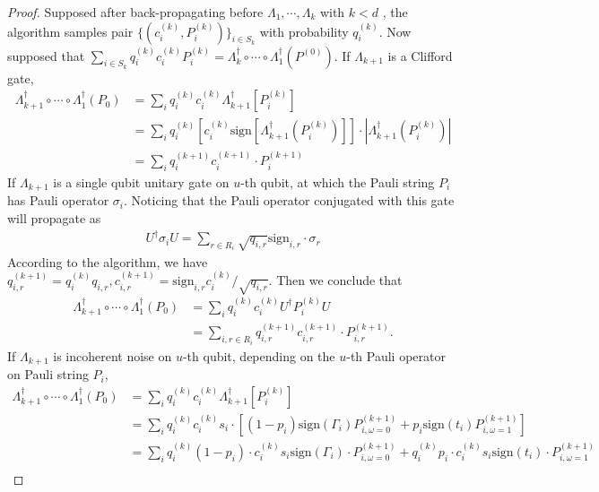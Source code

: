 \documentclass[aps,%
twocolumn,%
floatfix,%
pra,%
amsfonts,%
longbibliography,%
groupedaddress,%
superscriptaddress]{revtex4-2}%
\newcommand{\1}{\mathbbm{1}}
\begin{document}
\begin{proof}
    Supposed after back-propagating before $\Lambda_1, \cdots,\Lambda_k$ with $k < d$ ,  the algorithm samples pair $\{(c_i^{(k)}, P_i^{(k)})\}_{i \in S_k}$ with probability $q^{(k)}_i$. Now supposed that $\sum_{i \in S_k} q_i^{(k)} c_i^{(k)}P_i^{(k)} = \Lambda_k^\dagger \circ \cdots\circ\Lambda_1^\dagger(P^{(0)})$. 
    If $\Lambda_{k+1}$ is a Clifford gate, 
    \begin{align}
        \Lambda_{k+1}^\dagger \circ \cdots\circ\Lambda_1^\dagger(P_0) &= \sum_i q_i^{(k)} c_i^{(k)} \Lambda_{k+1}^\dagger[P_i^{(k)}]\\
        &=\sum_i q_i^{(k)} \left[c_i^{(k)} \text{sign}[\Lambda_{k+1}^\dagger(P_i^{(k)})] \right] \cdot|\Lambda_{k+1}^\dagger(P_i^{(k)})|\\
        &=\sum_i q_i^{(k+1)}c_i^{(k+1)}  \cdot P_i^{(k+1)}
    \end{align}
    If $\Lambda_{k+1}$ is a single qubit unitary gate on $u$-th qubit, at which the Pauli string $P_i$ has Pauli operator $\sigma_i$. Noticing that the Pauli operator conjugated with this gate will propagate as
\begin{align}
    U^\dagger \sigma_i U = \sum_{r\in R_i}\sqrt{q_{i,r }} \text{sign}_{i,r} \cdot \sigma_{r}
\end{align}
    According to the algorithm, we have
    $q_{i,r}^{(k+1)} = q_{i}^{(k)}q_{i,r}, c_{i,r}^{(k+1)} = \text{sign}_{i,r} c_{i}^{(k)}/\sqrt{q_{i,r}}$. Then we conclude that
      \begin{align}
        \Lambda_{k+1}^\dagger \circ \cdots\circ\Lambda_1^\dagger(P_0) &= \sum_i q_i^{(k)} c_i^{(k)} U^\dagger P_i^{(k)}U\\
        &=\sum_{i,r\in R_i} q_{i,r}^{(k+1)}c_{i,r}^{(k+1)}  \cdot P_{i,r}^{(k+1)}.
    \end{align}
    If $\Lambda_{k+1}$ is incoherent noise on $u$-th qubit, depending on the $u$-th Pauli operator on Pauli string $P_i$, 
     \begin{align}
        \Lambda_{k+1}^\dagger \circ \cdots\circ\Lambda_1^\dagger(P_0) &= \sum_i q_i^{(k)} c_i^{(k)} \Lambda_{k+1}^\dagger[P_i^{(k)}]\\
        &=\sum_{i} q_{i}^{(k)}c_{i}^{(k)} s_{i} \cdot \left[(1-p_{i})\text{sign}(\Gamma_{i})P_{i,\omega=0}^{(k+1)} + p_i\text{sign}(t_i) P_{i,\omega=1}^{(k+1)}\right]\\
        &=\sum_{i} q_{i}^{(k)}(1-p_i) \cdot c_{i}^{(k)} s_i \text{sign}(\Gamma_i) \cdot P_{i,\omega=0}^{(k+1)} + q_{i}^{(k)}p_i \cdot c_{i}^{(k)} s_i\text{sign}(t_i) \cdot P_{i,\omega=1}^{(k+1)}\\

\end{align}
\end{proof}
\end{document}
